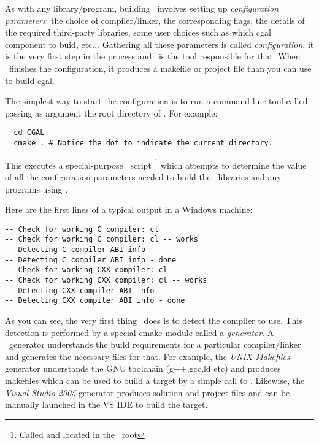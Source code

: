 As with any library/program, building \cgal\ involves setting up {\em configuration parameters}:
the choice of compiler/linker, the corresponding flags, the details of the required third-party libraries,
some user choices such as which cgal component to buid, etc... Gathering all these parameters is called
{\em configuration}, it is the very first step in the process and \cmake\ is the tool responsible for that. 
When \cmake\ finishes the configuration, it produces a makefile or project file than you can use to build cgal.

The simplest way to start the configuration is to run a command-line tool called  passing 
as argument the root directory of \cgal. For example:

{\ccTexHtml{\scriptsize}{}
\begin{verbatim}
  cd CGAL 
  cmake . # Notice the dot to indicate the current directory.
\end{verbatim}
}

This executes a special-purpose \cmake\ script
\footnote{Called  and located in the \cgal\ root} 
which attempts to determine the value of all the configuration parameters needed to build the \cgal\
libraries and any programs using \cgal. 

Here are the first lines of a typical output in a Windows machine:

{\ccTexHtml{\scriptsize}{}
\begin{verbatim}
-- Check for working C compiler: cl
-- Check for working C compiler: cl -- works
-- Detecting C compiler ABI info
-- Detecting C compiler ABI info - done
-- Check for working CXX compiler: cl
-- Check for working CXX compiler: cl -- works
-- Detecting CXX compiler ABI info
-- Detecting CXX compiler ABI info - done
\end{verbatim}
}

As you can see, the very first thing \cmake\ does is to detect the compiler to use.
This detection is performed by a special cmake module called a {\em generator}. A
\cmake\ generator understands the build requirements for a particular compiler/linker
 and generates the necessary files for that. For example, the 
{\em UNIX Makefiles} generator understands the GNU toolchain (g++,gcc,ld etc) and produces makefiles
which can be used to build a target by a simple call to \ccc{make}.
Likewise, the {\em Visual Studio 2005} generator produces solution and project files and can be manually
launched in the VS IDE to build the target.

